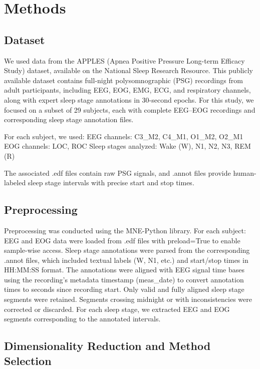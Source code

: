 \section{Methods}

\subsection{Dataset}

We used data from the APPLES (Apnea Positive Pressure Long-term Efficacy Study) dataset, available on the National Sleep Research Resource. This publicly available dataset contains full-night polysomnographic (PSG) recordings from adult participants, including EEG, EOG, EMG, ECG, and respiratory channels, along with expert sleep stage annotations in 30-second epochs. For this study, we focused on a subset of 29 subjects, each with complete EEG–EOG recordings and corresponding sleep stage annotation files.

For each subject, we used:
EEG channels: C3_M2, C4_M1, O1_M2, O2_M1
EOG channels: LOC, ROC
Sleep stages analyzed: Wake (W), N1, N2, N3, REM (R)

The associated .edf files contain raw PSG signals, and .annot files provide human-labeled sleep stage intervals with precise start and stop times.

\subsection{Preprocessing}

Preprocessing was conducted using the MNE-Python library. For each subject:
EEG and EOG data were loaded from .edf files with preload=True to enable sample-wise access.
Sleep stage annotations were parsed from the corresponding .annot files, which included textual labels (W, N1, etc.) and start/stop times in HH:MM:SS format.
The annotations were aligned with EEG signal time bases using the recording’s metadata timestamp (meas_date) to convert annotation times to seconds since recording start.
Only valid and fully aligned sleep stage segments were retained. Segments crossing midnight or with inconsistencies were corrected or discarded.
For each sleep stage, we extracted EEG and EOG segments corresponding to the annotated intervals.

\subsection{Dimensionality Reduction and Method Selection}

